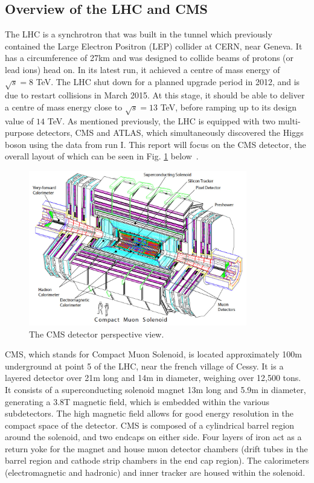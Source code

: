 \documentclass[10pt]{article}
\begin{document}
\subsection{Overview of the LHC and CMS}
The LHC is a synchrotron that was built in the tunnel which previously contained the Large Electron Positron (LEP) collider at CERN, near Geneva. It has a circumference of 27km and was designed to collide beams of protons (or lead ions) head on. In its latest run, it achieved a centre of mass energy of $\sqrt{s}=8$ TeV. The LHC shut down for a planned upgrade period in 2012, and is due to restart collisions in March 2015. At this stage, it should be able to deliver a centre of mass energy close to $\sqrt{s}=13$ TeV, before ramping up to its design value of $14$ TeV. 
As mentioned previously, the LHC is equipped with two multi-purpose detectors, CMS and ATLAS, which simultaneously discovered the Higgs boson using the data from run I. This report will focus on the CMS detector, the overall layout of which can be seen in Fig. \ref{cms} below~\cite{CMSTDR}.

\begin{figure}[h]
  \centering
  \includegraphics[width=0.85\textwidth]{"CMSExploded"}
  \caption{The CMS detector perspective view.}
  \label{cms}
\end{figure}
CMS, which stands for Compact Muon Solenoid, is located approximately 100m underground at point 5 of the LHC, near the french village of Cessy. It is a layered detector over 21m long and 14m in diameter, weighing over 12,500 tons. It consists of a superconducting solenoid magnet 13m long and 5.9m in diameter, generating a 3.8T magnetic field, which is embedded within the various subdetectors. The high magnetic field allows for good energy resolution in the compact space of the detector. CMS is composed of a cylindrical barrel region around the solenoid, and two endcaps on either side. Four layers of iron act as a return yoke for the magnet and house muon detector chambers (drift tubes in the barrel region and cathode strip chambers in the end cap region). The calorimeters (electromagnetic and hadronic) and inner tracker are housed within the solenoid. 
\end{document}
